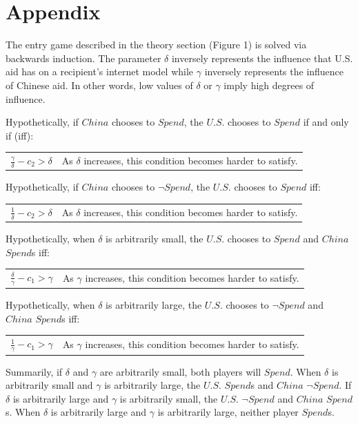 \documentclass[12pt]{article}
\begin{document}
\pagebreak
\section*{Appendix}
The entry game described in the theory section (Figure 1) is solved via backwards induction. The parameter $\delta$ inversely represents the influence that U.S. aid has on a recipient's internet model while $\gamma$ inversely represents the influence of Chinese aid. In other words, low values of $\delta$ or $\gamma$ imply high degrees of influence. 

Hypothetically, if $China$ chooses to $Spend$, the $U.S.$ chooses to $Spend$ if and only if (iff):

\begin{tabular}{c l}
    $\frac{\gamma}{\delta}-c_2> \delta$ &  As $\delta$ increases, this condition becomes harder to satisfy.\\
\end{tabular}

Hypothetically, if $China$ chooses to $\neg Spend$, the $U.S.$ chooses to $Spend$ iff:

\begin{tabular}{c l}
    $\frac{1}{\delta}-c_2> \delta$ &  As $\delta$ increases, this condition becomes harder to satisfy.\\
\end{tabular}

Hypothetically, when $\delta$ is arbitrarily small, the $U.S.$ chooses to $Spend$ and $China$ $Spend$s iff:

\begin{tabular}{c l}
    $\frac{\delta}{\gamma}-c_1> \gamma$ &  As $\gamma$ increases, this condition becomes harder to satisfy.\\
\end{tabular}

Hypothetically, when $\delta$ is arbitrarily large, the $U.S.$ chooses to $\neg Spend$ and $China$ $Spend$s iff:

\begin{tabular}{c l}
    $\frac{1}{\gamma}-c_1> \gamma$ &  As $\gamma$ increases, this condition becomes harder to satisfy.\\
\end{tabular}

Summarily, if $\delta$ and $\gamma$ are arbitrarily small, both players will $Spend$. When $\delta$ is arbitrarily small and $\gamma$ is arbitrarily large, the $U.S.$ $Spend$s and $China$ $\neg Spend$. If $\delta$ is arbitrarily large and $\gamma$ is arbitrarily small, the $U.S.$ $\neg Spend$ and $China$ $Spend$s. When $\delta$ is arbitrarily large and $\gamma$ is arbitrarily large, neither player $Spend$s.

\nocite{mechkova2022a}
\nocite{pemstein2022}
\nocite{coppedge2022}
\nocite{coppedge2022a}
\nocite{coppedge2022b}
\nocite{coppedge2022c}
\nocite{coppedge2022d}
\pagebreak
\printbibliography
\end{document}
